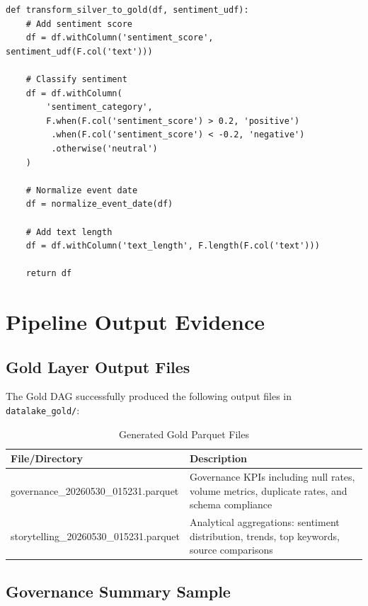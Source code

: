 \documentclass[12pt]{article}
\begin{document}
\begin{lstlisting}[caption=Gold Pipeline Core Transformations]
def transform_silver_to_gold(df, sentiment_udf):
    # Add sentiment score
    df = df.withColumn('sentiment_score', sentiment_udf(F.col('text')))
    
    # Classify sentiment
    df = df.withColumn(
        'sentiment_category',
        F.when(F.col('sentiment_score') > 0.2, 'positive')
         .when(F.col('sentiment_score') < -0.2, 'negative')
         .otherwise('neutral')
    )
    
    # Normalize event date
    df = normalize_event_date(df)
    
    # Add text length
    df = df.withColumn('text_length', F.length(F.col('text')))
    
    return df
\end{lstlisting}

\newpage

\section{Pipeline Output Evidence}
\label{sec:results_evidence}

\subsection{Gold Layer Output Files}

The Gold DAG successfully produced the following output files in \texttt{datalake\_gold/}:

\begin{table}[H]
\centering
\caption{Generated Gold Parquet Files}
\label{tab:gold_outputs}
\begin{tabular}{p{5cm}p{6cm}}
\toprule
\textbf{File/Directory} & \textbf{Description} \\
\midrule
governance\_20260530\_015231.parquet & Governance KPIs including null rates, volume metrics, duplicate rates, and schema compliance \\
storytelling\_20260530\_015231.parquet & Analytical aggregations: sentiment distribution, trends, top keywords, source comparisons \\
\bottomrule
\end{tabular}
\end{table}

\subsection{Governance Summary Sample}
\end{document}
